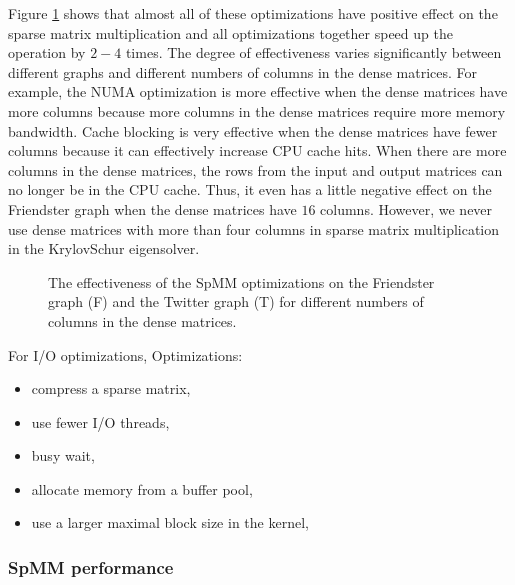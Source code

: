 Figure \ref{perf:spmm_opt} shows that almost all of these optimizations have
positive effect on the sparse matrix multiplication and all optimizations
together speed up the operation by $2-4$ times.
The degree of effectiveness varies
significantly between different graphs and different numbers of columns in
the dense matrices. For example, the NUMA optimization is more effective when
the dense matrices have more columns because more columns in the dense matrices
require more memory bandwidth. Cache blocking is very effective when
the dense matrices have fewer columns because it can effectively increase CPU
cache hits. When there are more columns in the dense matrices, the rows from
the input and output matrices can no longer be in the CPU cache. Thus, it even
has a little negative effect on the Friendster graph when the dense matrices
have $16$ columns. However, we never use dense matrices with more than four
columns in sparse matrix multiplication in the KrylovSchur eigensolver.


\begin{figure}
	\begin{center}
		\footnotesize
		\vspace{-15pt}
		
		\vspace{-15pt}
		\caption{The effectiveness of the SpMM optimizations on the Friendster
			graph (F) and the Twitter graph (T) for different numbers of
			columns in the dense matrices.}
		\label{perf:spmm_opt}
	\end{center}
\end{figure}

For I/O optimizations, Optimizations:

\begin{itemize} \itemsep1pt \parskip0pt 
	\item compress a sparse matrix,
	\item use fewer I/O threads,
	\item busy wait,
	\item allocate memory from a buffer pool,
	\item use a larger maximal block size in the kernel,
\end{itemize}

\subsubsection{SpMM performance}

